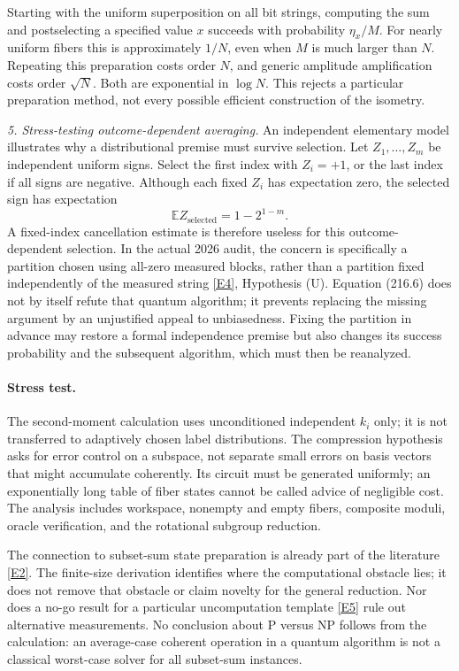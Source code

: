 \documentclass[11pt,a4paper]{article}
\newcommand{\E}{\mathbb{E}}
\newcommand{\eref}[2]{\hyperlink{extra:#1:#2}{[E#2]}}
\begin{document}
Starting with the uniform superposition on all bit strings, computing
the sum and postselecting a specified value $x$ succeeds with probability
$\eta_x/M$. For nearly uniform fibers this is approximately $1/N$, even
when $M$ is much larger than $N$. Repeating this preparation costs order
$N$, and generic amplitude amplification costs order $\sqrt N$.
Both are exponential in $\log N$. This rejects a particular preparation
method, not every possible efficient construction of the isometry.

\textit{5. Stress-testing outcome-dependent averaging.}
An independent elementary model illustrates why a distributional premise
must survive selection. Let $Z_1,\ldots,Z_m$ be independent uniform signs.
Select the first index with $Z_i=+1$, or the last index if all signs are
negative. Although each fixed $Z_i$ has expectation zero, the selected
sign has expectation
\[
 \E Z_{\mathrm{selected}}=1-2^{1-m}.                       \tag{216.6}
\]
A fixed-index cancellation estimate is therefore useless for this
outcome-dependent selection. In the actual 2026 audit, the concern is
specifically a partition chosen using all-zero measured blocks, rather
than a partition fixed independently of the measured string
\eref{30006794}{4}, Hypothesis (U). Equation (216.6) does not by itself refute
that quantum algorithm; it prevents replacing the missing argument by an
unjustified appeal to unbiasedness. Fixing the partition in advance may
restore a formal independence premise but also changes its success
probability and the subsequent algorithm, which must then be reanalyzed.

\paragraph{Stress test.}
The second-moment calculation uses unconditioned independent $k_i$ only;
it is not transferred to adaptively chosen label distributions. The
compression hypothesis asks for error control on a subspace, not separate
small errors on basis vectors that might accumulate coherently. Its circuit
must be generated uniformly; an exponentially long table of fiber states
cannot be called advice of negligible cost. The analysis includes workspace,
nonempty and empty fibers, composite moduli, oracle verification, and the
rotational subgroup reduction.

The connection to subset-sum state preparation is already part of the
literature \eref{30006794}{2}. The finite-size derivation identifies where the
computational obstacle lies; it does not remove that obstacle or claim
novelty for the general reduction. Nor does a no-go result for a particular
uncomputation template \eref{30006794}{5} rule out alternative measurements.
No conclusion about $\mathrm P$ versus $\mathrm{NP}$ follows from the
calculation: an average-case coherent operation in a quantum algorithm is
not a classical worst-case solver for all subset-sum instances.
\end{document}
